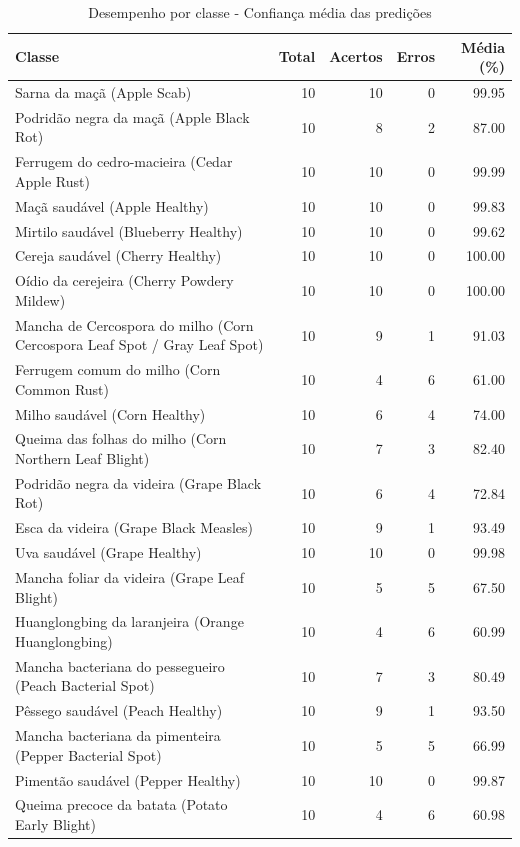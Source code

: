 \documentclass[portuguese]{sbc2025}%
\begin{document}
\begin{table}[ht]
\centering
\caption{Desempenho por classe - Confiança média das predições}
\renewcommand{\arraystretch}{0.9}
\setlength{\tabcolsep}{3pt}
{\scriptsize
\begin{tabular}{p{4.0cm}rrrr}
\hline
Classe & Total & Acertos & Erros & Média (\%) \\
\hline
Sarna da maçã (Apple Scab) & 10 & 10 & 0 & 99.95 \\
Podridão negra da maçã (Apple Black Rot) & 10 & 8 & 2 & 87.00 \\
Ferrugem do cedro-macieira (Cedar Apple Rust) & 10 & 10 & 0 & 99.99 \\
Maçã saudável (Apple Healthy) & 10 & 10 & 0 & 99.83 \\
Mirtilo saudável (Blueberry Healthy) & 10 & 10 & 0 & 99.62 \\
Cereja saudável (Cherry Healthy) & 10 & 10 & 0 & 100.00 \\
Oídio da cerejeira (Cherry Powdery Mildew) & 10 & 10 & 0 & 100.00 \\
Mancha de Cercospora do milho (Corn Cercospora Leaf Spot / Gray Leaf Spot) & 10 & 9 & 1 & 91.03 \\
Ferrugem comum do milho (Corn Common Rust) & 10 & 4 & 6 & 61.00 \\
Milho saudável (Corn Healthy) & 10 & 6 & 4 & 74.00 \\
Queima das folhas do milho (Corn Northern Leaf Blight) & 10 & 7 & 3 & 82.40 \\
Podridão negra da videira (Grape Black Rot) & 10 & 6 & 4 & 72.84 \\
Esca da videira (Grape Black Measles) & 10 & 9 & 1 & 93.49 \\
Uva saudável (Grape Healthy) & 10 & 10 & 0 & 99.98 \\
Mancha foliar da videira (Grape Leaf Blight) & 10 & 5 & 5 & 67.50 \\
Huanglongbing da laranjeira (Orange Huanglongbing) & 10 & 4 & 6 & 60.99 \\
Mancha bacteriana do pessegueiro (Peach Bacterial Spot) & 10 & 7 & 3 & 80.49 \\
Pêssego saudável (Peach Healthy) & 10 & 9 & 1 & 93.50 \\
Mancha bacteriana da pimenteira (Pepper Bacterial Spot) & 10 & 5 & 5 & 66.99 \\
Pimentão saudável (Pepper Healthy) & 10 & 10 & 0 & 99.87 \\
Queima precoce da batata (Potato Early Blight) & 10 & 4 & 6 & 60.98  \\

\end{tabular}}
\end{table}
\end{document}
